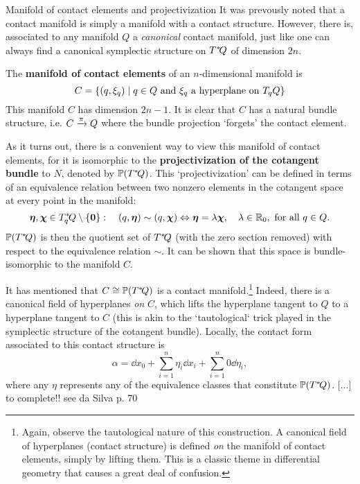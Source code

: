 \begin{mathbox}{Manifold of contact elements and projectivization}
    It was prevously noted that a contact manifold is simply a manifold with a contact structure. However, there is, associated to any manifold $Q$ a \emph{canonical} contact manifold, just like one can always find a canonical symplectic structure on $T^*\!Q$ of dimension $2n$. 

    The \textbf{manifold of contact elements} of an $n$-dimensional manifold is \cite{Cannas2001}
    $$ C = \qty{(q, \xi_q) \mid q \in Q \text{ and } \xi_q \text{ a hyperplane on } \ensuremath{T_qQ}} $$
    This manifold $C$ has dimension $2n - 1$. It is clear that $C$ has a natural bundle structure, i.e. $C\xrightarrow[]{\pi}Q$ where the bundle projection `forgets' the contact element.
    
    As it turns out, there is a convenient way to view this manifold of contact elements, for it is isomorphic to the \textbf{projectivization of the cotangent bundle} to $N$, denoted by $\mathbb{P}\qty(T^*\!Q)$. This `projectivization' can be defined in terms of an equivalence relation between two nonzero elements in the cotangent space at every point in the manifold:
    $$ \vec{\eta},\vec{\chi}\in \ctspace{q}{Q} \setminus \{\mathbf{0}\}:\quad (q, \vec{\eta}) \sim (q, \vec{\chi}) \Leftrightarrow \vec{\eta} = \lambda \vec{\chi},\quad \lambda \in \real_0, \text{ for all } q \in Q.$$
    $\mathbb{P}\qty(T^*\!Q)$ is then the quotient set of $T^*\!Q$ (with the zero section removed) with respect to the equivalence relation $\sim$. It can be shown that this space is bundle-isomorphic to the manifold $C$.

    It has mentioned that $C \cong \mathbb{P}\qty(T^*\!Q)$ is a contact manifold.\footnote
    {Again, observe the tautological nature of this construction. A canonical field of hyperplanes (contact structure) is defined \emph{on} the manifold of contact elements, simply by lifting them. This is a classic theme in differential geometry that causes a great deal of confusion.}
    Indeed, there is a canonical field of hyperplanes \emph{on} $C$, which lifts the hyperplane tangent to $Q$ to a hyperplane tangent to $C$ (this is akin to the `tautological` trick played in the symplectic structure of the cotangent bundle). Locally, the contact form associated to this contact structure is
    $$ \alpha = \dd{x}_0 + \sum_{i=1}^n \eta_i\dd{x}_i + \sum_{i=1}^n 0\dd{\eta_i}, $$
    where any $\eta$ represents any of the equivalence classes that constitute $\mathbb{P}\qty(T^*\!Q)$. [...] to complete!! see da Silva p. 70
\end{mathbox}

